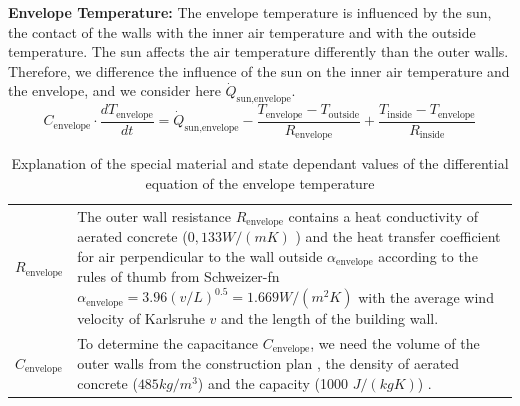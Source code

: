     \textbf{Envelope Temperature:}\newline
    The envelope temperature is influenced by the sun, the contact of the walls with the inner air temperature and with the outside temperature. The sun affects the air temperature differently than the outer walls. Therefore, we difference the influence of the sun on the inner air temperature and the envelope, and we consider here $\dot{Q}_\text{sun,envelope}$.  
    \begin{equation}
    \label{eq:diffEnvelope}
        C_\text{envelope}\cdot \frac{d T_\text{envelope}}{d t} = \dot{Q}_\text{sun,envelope} - \frac{T_\text{envelope}-T_\text{outside}}{R_\text{envelope}} + \frac{T_\text{inside}-T_\text{envelope}}{R_\text{inside}}
    \end{equation}
    \begin{table}[H]
        \centering
        \begin{tabular}{l p{13cm}}
        $R_\text{envelope}$ & The outer wall resistance $R_\text{envelope}$ contains a heat conductivity of aerated concrete ($0,133 W/(m K)$ \cite{GhaziWakili.2015}) and the heat transfer coefficient for air perpendicular to the wall outside $\alpha_\text{envelope}$ according to the rules of thumb from Schweizer-fn $\alpha_\text{envelope} = 3.96 (v / L)^{0.5} = 1.669 W/(m^2 K)$ \cite{Schweizer-fnalpha} with the average wind velocity of Karlsruhe $v$ \cite{AbteilungKlimaundUmweltberatung.2004} and the length of the building wall.\\
        $C_\text{envelope}$ & To determine the capacitance $C_\text{envelope}$, we need the volume of the outer walls from the construction plan \cite{Bauplan}, the density of aerated concrete ($485 kg/m^3$) and the capacity (1000 $J/(kg K)$) \cite{GhaziWakili.2015}. 
        \end{tabular}
        \caption{Explanation of the special material and state dependant values of the differential equation of the envelope temperature}
        \label{tab:valuesOfEnvelopeTemperature}
    \end{table}
   
